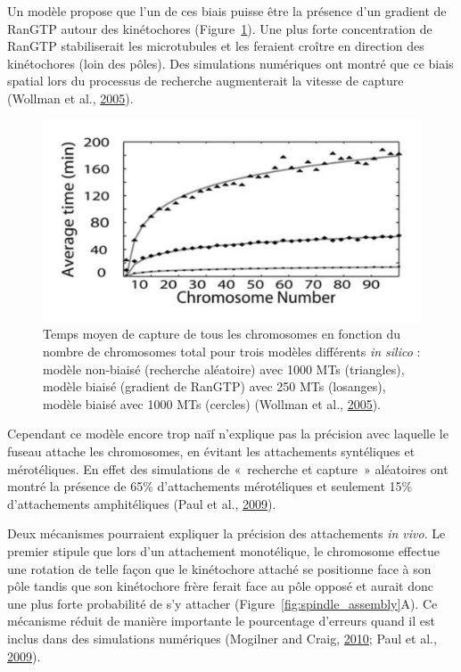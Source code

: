 \documentclass[12pt,a4paper,twoside,openright]{book}
\begin{document}
Un modèle propose que l'un de ces biais puisse être la présence d'un
gradient de RanGTP autour des kinétochores
(Figure~\ref{fig:assembly_time}). Une plus forte concentration de RanGTP
stabiliserait les microtubules et les feraient croître en direction des
kinétochores (loin des pôles). Des simulations numériques ont montré que
ce biais spatial lors du processus de recherche augmenterait la vitesse
de capture (Wollman et al., \protect\hyperlink{ref-Wollman2005}{2005}).

\begin{figure}[htbp]
\centering
\includegraphics{figures/intro/assembly_time.png}
\caption[Temps moyen de capture des chromosomes]{\label{fig:assembly_time}Temps
moyen de capture de tous les chromosomes en fonction du nombre de
chromosomes total pour trois modèles différents \emph{in silico} :
modèle non-biaisé (recherche aléatoire) avec 1000 MTs (triangles),
modèle biaisé (gradient de RanGTP) avec 250 MTs (losanges), modèle
biaisé avec 1000 MTs (cercles) (Wollman et al.,
\protect\hyperlink{ref-Wollman2005}{2005}).}
\end{figure}

Cependant ce modèle encore trop naïf n'explique pas la précision avec
laquelle le fuseau attache les chromosomes, en évitant les attachements
syntéliques et mérotéliques. En effet des simulations de «~recherche et
capture~» aléatoires ont montré la présence de 65\% d'attachements
mérotéliques et seulement 15\% d'attachements amphitéliques (Paul et
al., \protect\hyperlink{ref-Paul2009}{2009}).

Deux mécanismes pourraient expliquer la précision des attachements
\emph{in vivo}. Le premier stipule que lors d'un attachement
monotélique, le chromosome effectue une rotation de telle façon que le
kinétochore attaché se positionne face à son pôle tandis que son
kinétochore frère ferait face au pôle opposé et aurait donc une plus
forte probabilité de s'y attacher (Figure~\ref{fig:spindle_assembly}A).
Ce mécanisme réduit de manière importante le pourcentage d'erreurs quand
il est inclus dans des simulations numériques (Mogilner and Craig,
\protect\hyperlink{ref-Mogilner2010}{2010}; Paul et al.,
\protect\hyperlink{ref-Paul2009}{2009}).
\end{document}
